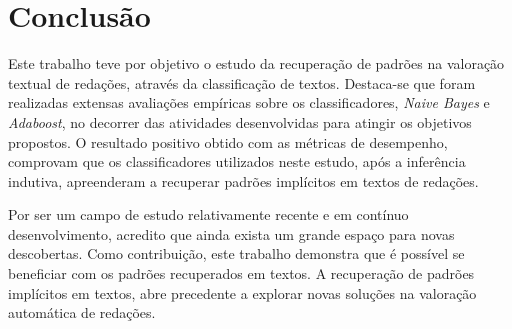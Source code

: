 \section{Conclusão}

Este trabalho teve por objetivo o estudo da recuperação de padrões na valoração 
textual de redações, através da classificação de textos. Destaca-se que foram 
realizadas extensas avaliações empíricas sobre os classificadores, 
\textit{Naive Bayes} e \textit{Adaboost}, no decorrer das atividades 
desenvolvidas para atingir os objetivos propostos. O resultado positivo obtido 
com as métricas de desempenho, comprovam que os classificadores utilizados 
neste estudo, após a inferência indutiva, apreenderam a recuperar padrões 
implícitos em textos de redações. 

Por ser um campo de estudo relativamente recente e em contínuo desenvolvimento, 
acredito que ainda exista um grande espaço para novas descobertas. Como 
contribuição, este trabalho demonstra que é possível se beneficiar com os 
padrões recuperados em textos. A recuperação de padrões implícitos em textos, 
abre precedente a explorar novas soluções na valoração automática de redações.